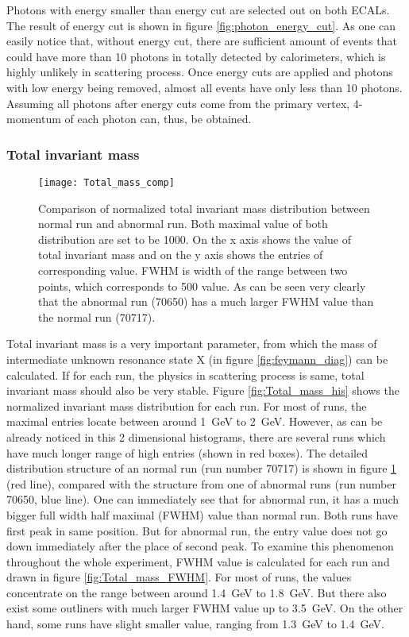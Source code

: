 Photons with energy smaller than energy cut are selected out on both ECALs. The result of energy cut is shown in figure \ref{fig:photon_energy_cut}. As one can easily notice that, without energy cut, there are sufficient amount of events that could have more than 10 photons in totally detected by calorimeters, which is highly unlikely in scattering process. Once energy cuts are applied and photons with low energy being removed, almost all events have only less than 10 photons. Assuming all photons after energy cuts come from the primary vertex, 4-momentum of each photon can, thus, be obtained.
\subsubsection{Total invariant mass}
\begin{figure}[!b]
	\centering
	\texttt{[image: Total\_mass\_comp]}
	\caption{Comparison of normalized total invariant mass distribution between normal run and abnormal run. Both maximal value of both distribution are set to be 1000. On the x axis shows the value of total invariant mass and on the y axis shows the entries of corresponding value. FWHM is width of the range between two points, which corresponds to 500 value. As can be seen very clearly that the abnormal run (70650) has a much larger FWHM value than the normal run (70717).}
	\label{fig:Total_mass_comp}
\end{figure}
Total invariant mass is a very important parameter, from which the mass of intermediate unknown resonance state X (in figure \ref{fig:feymann_diag}) can be calculated. If for each run, the physics in scattering process is same, total invariant mass should also be very stable. Figure \ref{fig:Total_mass_his} shows the normalized invariant mass distribution for each run. For most of runs, the maximal entries locate between around \SI{1}{\giga\electronvolt} to \SI{2}{\giga\electronvolt}. However, as can be already noticed in this 2 dimensional histograms, there are several runs which have much longer range of high entries (shown in red boxes). The detailed distribution structure of an normal run (run number 70717) is shown in figure \ref{fig:Total_mass_comp} (red line), compared with the structure from one of abnormal runs (run number 70650, blue line). One can immediately see that for abnormal run, it has a much bigger full width half maximal (FWHM) value than normal run. Both runs have first peak in same position. But for abnormal run, the entry value does not go down immediately after the place of second peak. To examine this phenomenon throughout the whole experiment, FWHM value is calculated for each run and drawn in figure \ref{fig:Total_mass_FWHM}. For most of runs, the values concentrate on the range between around \SI{1.4}{\giga\electronvolt} to \SI{1.8}{\giga\electronvolt}. But there also exist some outliners with much larger FWHM value up to \SI{3.5}{\giga\electronvolt}. On the other hand, some runs have slight smaller value, ranging from \SI{1.3}{\giga\electronvolt} to \SI{1.4}{\giga\electronvolt}.

